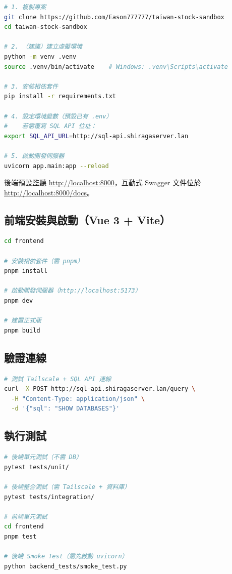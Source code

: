 \documentclass[UTF8, a4paper, 12pt, fontset=none]{ctexart}
\begin{document}
\begin{lstlisting}[language=bash]
# 1. 複製專案
git clone https://github.com/Eason777777/taiwan-stock-sandbox
cd taiwan-stock-sandbox

# 2. （建議）建立虛擬環境
python -m venv .venv
source .venv/bin/activate    # Windows: .venv\Scripts\activate

# 3. 安裝相依套件
pip install -r requirements.txt

# 4. 設定環境變數（預設已有 .env）
#    若需覆寫 SQL API 位址：
export SQL_API_URL=http://sql-api.shiragaserver.lan

# 5. 啟動開發伺服器
uvicorn app.main:app --reload
\end{lstlisting}
後端預設監聽 \url{http://localhost:8000}，互動式 Swagger 文件位於 \url{http://localhost:8000/docs}。
\subsection {前端安裝與啟動（Vue 3 + Vite）}

\begin{lstlisting}[language=bash]
cd frontend

# 安裝相依套件（需 pnpm）
pnpm install

# 啟動開發伺服器（http://localhost:5173）
pnpm dev

# 建置正式版
pnpm build
\end{lstlisting}
\vspace{-0.3cm}
\subsection{驗證連線}
\begin{lstlisting}[language=bash]
# 測試 Tailscale + SQL API 連線
curl -X POST http://sql-api.shiragaserver.lan/query \
  -H "Content-Type: application/json" \
  -d '{"sql": "SHOW DATABASES"}'
\end{lstlisting}
\vspace{-0.3cm}
\subsection{執行測試}

\begin{lstlisting}[language=bash]
# 後端單元測試（不需 DB）
pytest tests/unit/

# 後端整合測試（需 Tailscale + 資料庫）
pytest tests/integration/

# 前端單元測試
cd frontend
pnpm test

# 後端 Smoke Test（需先啟動 uvicorn）
python backend_tests/smoke_test.py
\end{lstlisting}
\end{document}
